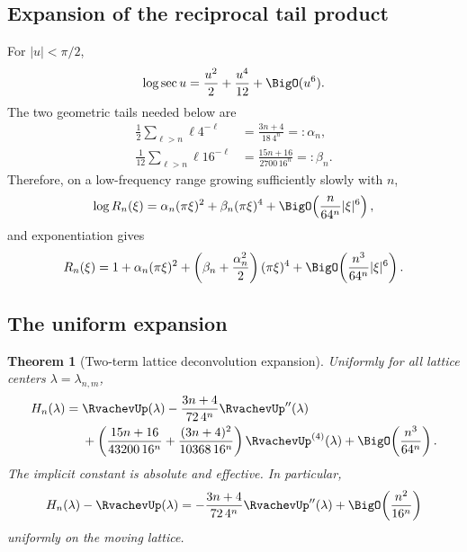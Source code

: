 \documentclass[11pt,oneside]{article}
\newtheorem{theorem}{Theorem}[section]
\theoremstyle{definition}
\theoremstyle{remark}
\begin{document}
\subsection{Expansion of the reciprocal tail product}

For $|u|<\pi/2$,
\begin{equation}
 \log\sec u=\frac{u^2}{2}+\frac{u^4}{12}+\BigO(u^6).       \label{tmrates:eq:logsec}
\end{equation}
The two geometric tails needed below are
\begin{align}
 \frac12\sum_{\ell>n}\ell4^{-\ell}
 &=\frac{3n+4}{18\,4^n}=:\alpha_n,                        \label{tmrates:eq:alpha-n}\\
 \frac1{12}\sum_{\ell>n}\ell16^{-\ell}
 &=\frac{15n+16}{2700\,16^n}=: \beta_n.                  \label{tmrates:eq:beta-n}
\end{align}
Therefore, on a low-frequency range growing sufficiently slowly with $n$,
\begin{equation}
 \log R_n(\xi)
 =\alpha_n(\pi\xi)^2+\beta_n(\pi\xi)^4
  +\BigO\!\left(\frac{n}{64^n}|\xi|^6\right),            \label{tmrates:eq:log-Rn}
\end{equation}
and exponentiation gives
\begin{equation}
 R_n(\xi)=1+\alpha_n(\pi\xi)^2
 +\left(\beta_n+\frac{\alpha_n^2}{2}\right)(\pi\xi)^4
 +\BigO\!\left(\frac{n^3}{64^n}|\xi|^6\right).          \label{tmrates:eq:Rn-expansion}
\end{equation}

\subsection{The uniform expansion}

\begin{theorem}[Two-term lattice deconvolution expansion]
\label{tmrates:thm:center-expansion}
Uniformly for all lattice centers $\lambda=\lambda_{n,m}$,
\begin{align}
 H_n(\lambda)
={}&\RvachevUp(\lambda)
 -\frac{3n+4}{72\,4^n}\RvachevUp''(\lambda) \notag\\
 &+\left(
   \frac{15n+16}{43200\,16^n}
  +\frac{(3n+4)^2}{10368\,16^n}
  \right)\RvachevUp^{(4)}(\lambda)
 +\BigO\!\left(\frac{n^3}{64^n}\right).                 \label{tmrates:eq:center-expansion}
\end{align}
The implicit constant is absolute and effective.  In particular,
\begin{equation}
 H_n(\lambda)-\RvachevUp(\lambda)
 =-\frac{3n+4}{72\,4^n}\RvachevUp''(\lambda)
  +\BigO\!\left(\frac{n^2}{16^n}\right)                 \label{tmrates:eq:center-leading}
\end{equation}
uniformly on the moving lattice.
\end{theorem}
\end{document}
